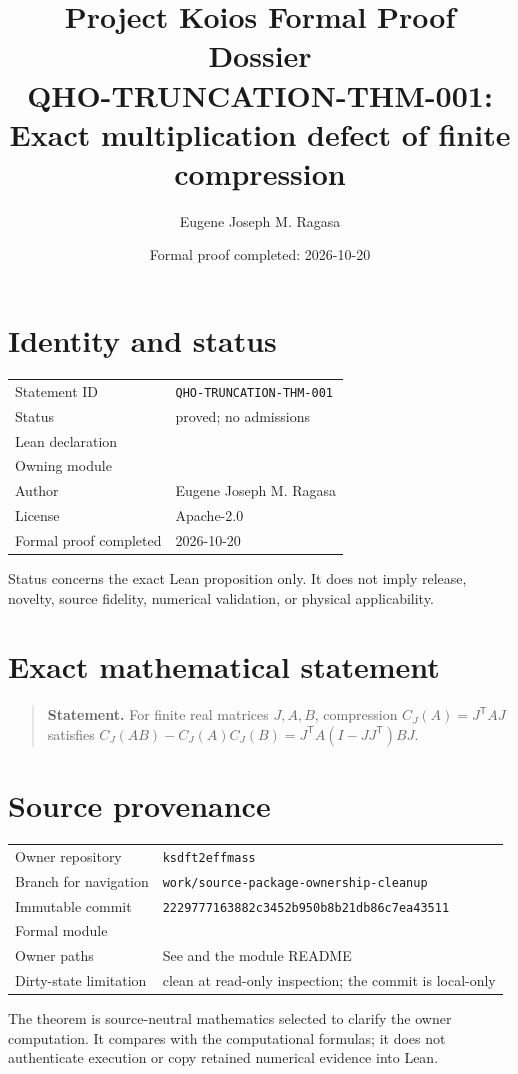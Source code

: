 \documentclass[11pt]{article}
\title{Project Koios Formal Proof Dossier\\\large QHO-TRUNCATION-THM-001: Exact multiplication defect of finite compression}
\author{Eugene Joseph M. Ragasa}
\date{Formal proof completed: 2026-10-20}
\begin{document}
\maketitle

\section{Identity and status}
\begin{tabularx}{\textwidth}{@{}lY@{}}\toprule
Statement ID & \texttt{QHO-TRUNCATION-THM-001} \\
Status & proved; no admissions \\
Lean declaration &  \\
Owning module &  \\
Author & Eugene Joseph M. Ragasa \\
License & Apache-2.0 \\
Formal proof completed & 2026-10-20 \\
\bottomrule\end{tabularx}
Status concerns the exact Lean proposition only. It does not imply release, novelty,
source fidelity, numerical validation, or physical applicability.

\section{Exact mathematical statement}
\begin{quote}\textbf{Statement.} For finite real matrices $J,A,B$, compression $C_J(A)=J^{\mathsf T}AJ$ satisfies $C_J(AB)-C_J(A)C_J(B)=J^{\mathsf T}A(I-JJ^{\mathsf T})BJ$.\end{quote}

\section{Source provenance}
\begin{tabularx}{\textwidth}{@{}lY@{}}\toprule
Owner repository & \texttt{ksdft2effmass} \\
Branch for navigation & \texttt{work/source-package-ownership-cleanup} \\
Immutable commit & \texttt{2229777163882c3452b950b8b21db86c7ea43511} \\
Formal module &  \\
Owner paths & See  and the module README \\
Dirty-state limitation & clean at read-only inspection; the commit is local-only \\
\bottomrule\end{tabularx}
The theorem is source-neutral mathematics selected to clarify the owner computation. It
compares with the computational formulas; it does not authenticate execution or copy
retained numerical evidence into Lean.
\end{document}
